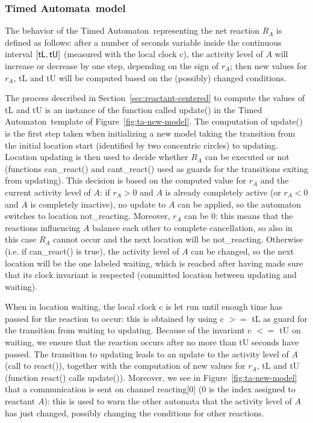 \documentclass{bmcart}
\def\ta{Timed Automaton}
\def\tas{Timed Automata}
\begin{document}
\subsubsection*{\tas\ model}\label{sec:ta-model}
The behavior of the \ta\ representing the net reaction $R_A$ is defined as follows: after a number of seconds
variable inside the continuous interval $[\mbox{\sf tL}, \mbox{\sf tU}]$ (measured with the local clock {\sf c}),
the activity level of $A$ will increase or
decrease by one step, depending on the sign of $r_A$; then new values for $r_A$, {\sf tL} and {\sf tU} will be computed based
on the (possibly) changed conditions.

The process described in Section~\ref{sec:reactant-centered} to compute the values of {\sf tL} and {\sf tU} is an instance of the function called {\sf update()}
in the \ta\ template of Figure~\ref{fig:ta-new-model}. The computation of {\sf update()} is the first step
taken when initializing a new model taking the transition from the initial location {\sf start} (identified by two concentric circles)
to {\sf updating}.
Location {\sf updating} is then used to decide whether $R_A$ can be executed or not (functions
{\sf can\_react()} and {\sf cant\_react()} used as guards for the transitions exiting from {\sf updating}).
This decision is based on the computed value for
$r_A$ and the current activity level of $A$: if $r_A > 0$ and $A$ is already completely active
(or  $r_A < 0$ and $A$ is completely inactive), no
update to $A$ can be applied, so the automaton switches to location {\sf not\_reacting}.
Moreover, $r_A$ can be $0$: this means
that the reactions influencing $A$ balance each other to complete cancellation, so also in this
case $R_A$ cannot occur and the next location will be {\sf not\_reacting}. Otherwise (i.e. if {\sf can\_react()} is true), the activity
level of $A$ can be changed, so the next location will be the one labeled {\sf waiting}, which
is reached after having made sure that its clock invariant is respected (committed location
between {\sf updating} and {\sf waiting}).

When in location {\sf waiting}, the local clock {\sf c}
is let run until enough time has passed for the reaction to occur: this is obtained by using {\sf c $>=$ tL} as guard
for the transition from {\sf waiting} to {\sf updating}.
Because of the invariant {\sf c $<=$ tU} on {\sf waiting}, we ensure that the reaction occurs after no more than {\sf tU} seconds have passed.
The transition to {\sf updating} leads to an update to the activity level of $A$ (call to {\sf react()}), together with the computation of new values for $r_A$,
{\sf tL} and {\sf tU} (function {\sf react()} calls {\sf update()}). Moreover, we see in Figure~\ref{fig:ta-new-model}
that a communication is sent on channel {\sf reacting[0]} ($0$ is the index
assigned to reactant $A$): this is used to warn
the other automata that the activity level of $A$ has just changed, possibly changing the conditions for
other reactions.
\end{document}
